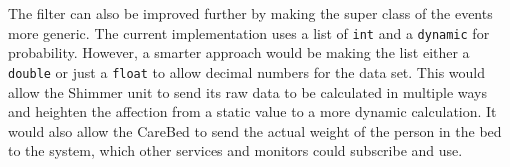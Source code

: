 The filter can also be improved further by making the super class of the events more generic.
The current implementation uses a list of \texttt{int} and a \texttt{dynamic} for probability.
However, a smarter approach would be making the list either a \texttt{double} or just a \texttt{float} to allow decimal numbers for the data set.
This would allow the Shimmer unit to send its raw data to be calculated in multiple ways and heighten the affection from a static value to a more dynamic calculation.
It would also allow the CareBed to send the actual weight of the person in the bed to the system, which other services and monitors could subscribe and use.





